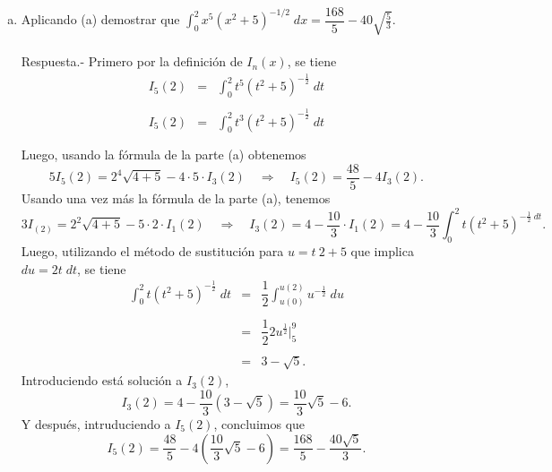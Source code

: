 \begin{enumerate}[\bfseries 1.]
\begin{enumerate}[a)]
	    \item Aplicando (a) demostrar que $\int_0^2 x^5\left(x^2+5\right)^{-1/2}\; dx = \dfrac{168}{5}-40\sqrt{\frac{5}{3}}.$\\\\
		Respuesta.-\; Primero por la definición de $I_n(x)$, se tiene
		$$
		\begin{array}{rcl}
		    I_5(2)&=&\displaystyle\int_0^2 t^5\left(t^2+5\right)^{-\frac{1}{2}}\; dt\\\\
		    I_5(2)&=&\displaystyle\int_0^2 t^3\left(t^2+5\right)^{-\frac{1}{2}}\; dt\\\\
		\end{array}
		$$
		Luego, usando la fórmula de la parte (a) obtenemos
		$$5I_5(2)=2^4\sqrt{4+5}-4\cdot 5 \cdot I_3(2) \quad \Rightarrow \quad I_5(2)=\dfrac{48}{5}-4I_3(2).$$
		Usando una vez más la fórmula de la parte (a), tenemos
		$$3I_(2)=2^2\sqrt{4+5}-5\cdot 2 \cdot I_1(2) \quad \Rightarrow \quad I_3(2)=4-\dfrac{10}{3}\cdot I_1(2)=4-\dfrac{10}{3}\int_0^2 t\left(t^2+5\right)^{-\frac{1}{2}\; dt}.$$
		Luego, utilizando el método de sustitución para $u=t~ 2+5$ que implica $du=2t\; dt$, se tiene
		$$
		    \begin{array}{rcl}
			\displaystyle\int_0^2 t\left(t^2+5\right)^{-\frac{1}{2}} \; dt &=& \dfrac{1}{2}\displaystyle\int_{u(0)}^{u(2)} u^{-\frac{1}{2}}\; du\\\\
			&=& \dfrac{1}{2}2u^{\frac{1}{2}}\bigg|_5^9\\\\
			&=& 3 - \sqrt{5}.
		    \end{array}
		$$
		Introduciendo está solución a $I_3(2)$,
		$$I_3(2)=4-\dfrac{10}{3}\left(3-\sqrt{5}\right)=\dfrac{10}{3}\sqrt{5}-6.$$
		Y después, intruduciendo a $I_5(2)$, concluimos que 
		$$I_5(2)=\dfrac{48}{5}-4\left(\dfrac{10}{3}\sqrt{5}-6\right)=\dfrac{168}{5}-\dfrac{40\sqrt{5}}{3}.$$\\

	\end{enumerate}


\end{enumerate}
